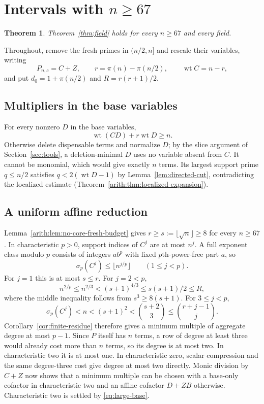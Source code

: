 \documentclass[11pt]{article}
\DeclareMathOperator{\wt}{wt}\DeclareMathOperator{\ord}{ord}
\numberwithin{equation}{section}
\newtheorem{theorem}{Theorem}[section]
\theoremstyle{definition}\newtheorem{definition}[theorem]{Definition}
\theoremstyle{remark}\newtheorem{remark}[theorem]{Remark}
\begin{document}
\section{Intervals with \texorpdfstring{$n\ge67$}{n >= 67}}
\label{sec:large-weighted}

\begin{theorem}\label{thm:large-weighted}
Theorem~\ref{thm:field} holds for every $n\ge67$ and every field.
\end{theorem}

Throughout, remove the fresh primes in $(n/2,n]$ and rescale their
variables, writing
\[
 P_{n,c}=C+Z,\qquad r=\pi(n)-\pi(n/2),\qquad
 \wt C=n-r,
\]
and put $d_0=1+\pi(n/2)$ and $R=r(r+1)/2$. 

\subsection{Multipliers in the base variables}

For every nonzero $D$ in the base variables,
\begin{equation}\label{eq:large-base}
 \wt(CD)+r\wt D\ge n.
\end{equation}
Otherwise delete dispensable terms and normalize $D$; by the slice
argument of Section~\ref{sec:tools}, a deletion-minimal $D$ uses no
variable absent from $C$. It cannot be
monomial, which would give exactly $n$ terms. Its largest support
prime $q\le n/2$ satisfies $q<2(\wt D-1)$ by
Lemma~\ref{lem:directed-cut}, contradicting the localized estimate
(Theorem~\ref{arith:thm:localized-expansion}).

\subsection{A uniform affine reduction}

Lemma~\ref{arith:lem:no-core-fresh-budget} gives
$r\ge s:=\lfloor\sqrt n\rfloor\ge8$ for every $n\ge67$.
In characteristic $p>0$, support indices of $C^j$ are at most $n^j$.
A full exponent class modulo $p$ consists of integers $ab^p$ with
fixed $p$th-power-free part $a$, so
\[
 \sigma_p(C^j)\le\lfloor n^{j/p}\rfloor\qquad(1\le j<p).
\]
For $j=1$ this is at most $s\le r$. For $j=2<p$,
\[
 n^{2/p}\le n^{2/3}<(s+1)^{4/3}
 \le s(s+1)/2\le R,
\]
where the middle inequality follows from $s^3\ge8(s+1)$.
For $3\le j<p$,
\[
 \sigma_p(C^j)<n<(s+1)^2<\binom{s+2}{3}
 \le\binom{r+j-1}{j}.
\]
Corollary~\ref{cor:finite-residue} therefore gives a minimum multiple
of aggregate degree at most $p-1$. Since $P$ itself has $n$ terms,
a row of degree at least three
would already cost more than $n$ terms, so its degree is at most two.
In characteristic two it is at most one. In characteristic zero,
scalar compression and the same degree-three cost give degree at most
two directly. Monic division by $C+Z$ now shows that a minimum
multiple can be chosen with a base-only cofactor in characteristic two
and an affine cofactor $D+ZB$ otherwise. Characteristic two is settled
by \eqref{eq:large-base}.
\end{document}
